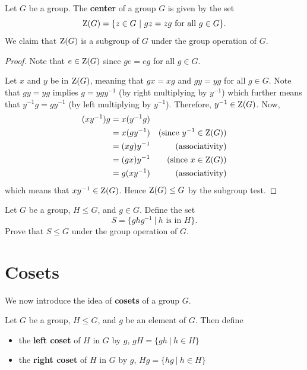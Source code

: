 \begin{example}\label{example-center-of-group}
    Let $G$ be a group. The \textbf{center} of a group $G$ is given by the set
    \[
        \Z{G} = \{z \in G \ | \ gz = zg \text{ for all } g \in G\}.
    \]
    We claim that $\mathrm{Z}(G)$ is a subgroup of $G$ under the group operation of $G$.

    \begin{proof}
	    Note that $e \in \mathrm{Z}(G)$ since $ge = eg$ for all $g \in G$.

	    Let $x$ and $y$ be in $\mathrm{Z}(G)$, meaning that $gx = xg$ and $gy = yg$ for all $g \in G$. Note that $gy = yg$ implies $g = ygy^{-1}$ (by right multiplying by $y^{-1}$) which further means that $y^{-1}g = gy^{-1}$ (by left multiplying by $y^{-1}$). Therefore, $y^{-1} \in \mathrm{Z}(G)$. Now,
	    \begin{align*}
	        (xy^{-1})g &= x(y^{-1}g)\\
	        &= x(gy^{-1}) & \text{(since } y^{-1} \in \mathrm{Z}(G))\\
	        &= (xg)y^{-1} & \text{(associativity)}\\
	        &= (gx)y^{-1} & \text{(since } x \in \mathrm{Z}(G))\\
	        &= g(xy^{-1}) & \text{(associativity)}
	    \end{align*}
	    which means that $xy^{-1} \in \mathrm{Z}(G)$. Hence $\mathrm{Z}(G) \leq G$ by the subgroup test.
    \end{proof}
\end{example}

\begin{exercise}\label{exercise-conjugate-subgroup}
    Let $G$ be a group, $H \leq G$, and $g \in G$. Define the set
    \[
        S = \{ghg^{-1} \ | \ h \text{ is in } H\}.
    \]
    Prove that $S \leq G$ under the group operation of $G$.
\end{exercise}

\newpage

\section{Cosets}
We now introduce the idea of \textbf{cosets} of a group $G$.
\begin{definition}
    Let $G$ be a group, $H \leq G$, and $g$ be an element of $G$. Then define
    \begin{itemize}
        \item the \textbf{left coset} of $H$ in $G$ by $g$, $gH = \{gh \ | \ h \in H\}$
        \item the \textbf{right coset} of $H$ in $G$ by $g$, $Hg = \{hg \ | \ h \in H\}$
    \end{itemize}
\end{definition}

